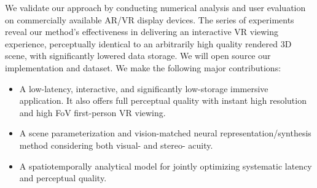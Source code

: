 



We validate our approach by conducting numerical analysis and user evaluation on commercially available AR/VR display devices. The series of experiments reveal our method's effectiveness in delivering an interactive VR viewing experience, perceptually identical to an arbitrarily high quality rendered 3D scene, with significantly lowered data storage. We will open source our implementation and dataset.
We make the following major contributions:
\begin{itemize}
    \item A low-latency, interactive, and significantly low-storage immersive application. It also offers full perceptual quality with instant high resolution and high FoV first-person VR viewing.
    \item A scene parameterization and vision-matched neural representation/synthesis method considering both visual- and stereo- acuity.
    \item A spatiotemporally analytical model for jointly optimizing systematic latency and perceptual quality.
\end{itemize}
